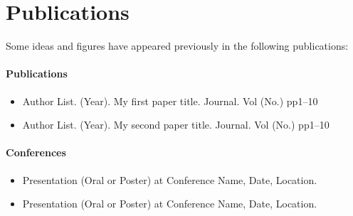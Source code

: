 \chapter*{Publications} %
{ \small
Some ideas and figures have appeared previously in the following publications:

\bigskip

\subsubsection{Publications}
\begin{itemize}
	\item Author List. (Year). My first paper title. Journal. Vol (No.) pp1--10
	\item Author List. (Year). My second paper title. Journal. Vol (No.) pp1--10
\end{itemize}

\bigskip

\subsubsection{Conferences}
\begin{itemize}
	\item Presentation (Oral or Poster) at Conference Name, Date, Location.
	\item Presentation (Oral or Poster) at Conference Name, Date, Location.
\end{itemize}
}